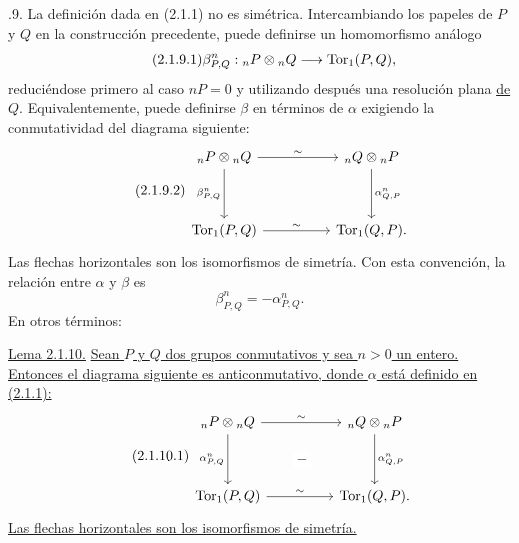 \par\medskip{}.9. La definición dada en (2.1.1) no es simétrica. Intercambiando
los papeles de $P$ y $Q$ en la construcción precedente, puede
definirse un homomorfismo análogo
\begin{equation}\tag{2.1.9.1}
 \beta^n_{P,Q}:{}_nP\otimes{}_nQ\longrightarrow\operatorname{Tor}_1(P,Q),
\end{equation}
reduciéndose primero al caso $nP=0$ y utilizando después una
resolución plana \underline{de} $Q$. Equivalentemente, puede definirse
$\beta$ en términos de $\alpha$ exigiendo la conmutatividad del
diagrama siguiente:
\begin{equation}\tag{2.1.9.2}
\begin{tikzcd}[column sep=huge,row sep=huge]
 {}_nP\otimes{}_nQ
   \arrow[r,"\sim"]
   \arrow[d,"{\beta^n_{P,Q}}"']&
 {}_nQ\otimes{}_nP
   \arrow[d,"{\alpha^n_{Q,P}}"]\\
 \uTor_1(P,Q)\arrow[r,"\sim"]&
 \uTor_1(Q,P).
\end{tikzcd}
\end{equation}
Las flechas horizontales son los isomorfismos de simetría. Con esta
convención, la relación entre $\alpha$ y $\beta$ es
\begin{equation}\tag{2.1.9.3}
 \beta^n_{P,Q}=-\alpha^n_{P,Q}.
\end{equation}
En otros términos:

\medskip
\noindent\underline{Lema 2.1.10.}
\underline{Sean $P$ y $Q$ dos grupos conmutativos y sea $n>0$ un
entero. Entonces el diagrama siguiente es anticonmutativo, donde
$\alpha$ está definido en (2.1.1):}
\begin{equation}\tag{2.1.10.1}
\begin{tikzcd}[column sep=huge,row sep=huge]
 {}_nP\otimes{}_nQ
   \arrow[r,"\sim"]
   \arrow[d,"{\alpha^n_{P,Q}}"']&
 {}_nQ\otimes{}_nP
   \arrow[d,"{\alpha^n_{Q,P}}"]\\
 \uTor_1(P,Q)
   \arrow[r,"\sim"]
   \arrow[ur,phantom,"-" description]&
 \uTor_1(Q,P).
\end{tikzcd}
\end{equation}
\underline{Las flechas horizontales son los isomorfismos de simetría.}


